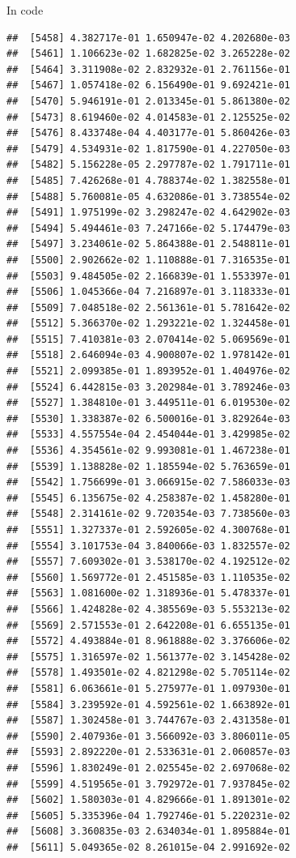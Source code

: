 \documentclass[ignorenonframetext,]{beamer}
\begin{document}
\begin{frame}[fragile]{In code}
\begin{verbatim}
##  [5458] 4.382717e-01 1.650947e-02 4.202680e-03
##  [5461] 1.106623e-02 1.682825e-02 3.265228e-02
##  [5464] 3.311908e-02 2.832932e-01 2.761156e-01
##  [5467] 1.057418e-02 6.156490e-01 9.692421e-01
##  [5470] 5.946191e-01 2.013345e-01 5.861380e-02
##  [5473] 8.619460e-02 4.014583e-01 2.125525e-02
##  [5476] 8.433748e-04 4.403177e-01 5.860426e-03
##  [5479] 4.534931e-02 1.817590e-01 4.227050e-03
##  [5482] 5.156228e-05 2.297787e-02 1.791711e-01
##  [5485] 7.426268e-01 4.788374e-02 1.382558e-01
##  [5488] 5.760081e-05 4.632086e-01 3.738554e-02
##  [5491] 1.975199e-02 3.298247e-02 4.642902e-03
##  [5494] 5.494461e-03 7.247166e-02 5.174479e-03
##  [5497] 3.234061e-02 5.864388e-01 2.548811e-01
##  [5500] 2.902662e-02 1.110888e-01 7.316535e-01
##  [5503] 9.484505e-02 2.166839e-01 1.553397e-01
##  [5506] 1.045366e-04 7.216897e-01 3.118333e-01
##  [5509] 7.048518e-02 2.561361e-01 5.781642e-02
##  [5512] 5.366370e-02 1.293221e-02 1.324458e-01
##  [5515] 7.410381e-03 2.070414e-02 5.069569e-01
##  [5518] 2.646094e-03 4.900807e-02 1.978142e-01
##  [5521] 2.099385e-01 1.893952e-01 1.404976e-02
##  [5524] 6.442815e-03 3.202984e-01 3.789246e-03
##  [5527] 1.384810e-01 3.449511e-01 6.019530e-02
##  [5530] 1.338387e-02 6.500016e-01 3.829264e-03
##  [5533] 4.557554e-04 2.454044e-01 3.429985e-02
##  [5536] 4.354561e-02 9.993081e-01 1.467238e-01
##  [5539] 1.138828e-02 1.185594e-02 5.763659e-01
##  [5542] 1.756699e-01 3.066915e-02 7.586033e-03
##  [5545] 6.135675e-02 4.258387e-02 1.458280e-01
##  [5548] 2.314161e-02 9.720354e-03 7.738560e-03
##  [5551] 1.327337e-01 2.592605e-02 4.300768e-01
##  [5554] 3.101753e-04 3.840066e-03 1.832557e-02
##  [5557] 7.609302e-01 3.538170e-02 4.192512e-02
##  [5560] 1.569772e-01 2.451585e-03 1.110535e-02
##  [5563] 1.081600e-02 1.318936e-01 5.478337e-01
##  [5566] 1.424828e-02 4.385569e-03 5.553213e-02
##  [5569] 2.571553e-01 2.642208e-01 6.655135e-01
##  [5572] 4.493884e-01 8.961888e-02 3.376606e-02
##  [5575] 1.316597e-02 1.561377e-02 3.145428e-02
##  [5578] 1.493501e-02 4.821298e-02 5.705114e-02
##  [5581] 6.063661e-01 5.275977e-01 1.097930e-01
##  [5584] 3.239592e-01 4.592561e-02 1.663892e-01
##  [5587] 1.302458e-01 3.744767e-03 2.431358e-01
##  [5590] 2.407936e-01 3.566092e-03 3.806011e-05
##  [5593] 2.892220e-01 2.533631e-01 2.060857e-03
##  [5596] 1.830249e-01 2.025545e-02 2.697068e-02
##  [5599] 4.519565e-01 3.792972e-01 7.937845e-02
##  [5602] 1.580303e-01 4.829666e-01 1.891301e-02
##  [5605] 5.335396e-04 1.792746e-01 5.220231e-02
##  [5608] 3.360835e-03 2.634034e-01 1.895884e-01
##  [5611] 5.049365e-02 8.261015e-04 2.991692e-02

\end{verbatim}
\end{frame}
\end{document}
